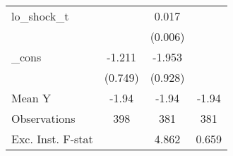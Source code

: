 {\begin{tabular}{l*{3}{c}}
\addlinespace
lo\_shock\_t  &                     &       0.017\sym{***}&                     \\
            &                     &     (0.006)         &                     \\
\addlinespace
\_cons      &      -1.211         &      -1.953\sym{**} &                     \\
            &     (0.749)         &     (0.928)         &                     \\
\midrule
Mean Y      &       -1.94         &       -1.94         &       -1.94         \\
Observations&         398         &         381         &         381         \\
Exc. Inst. F-stat&                     &       4.862         &       0.659         \\
\bottomrule
\end{tabular}
}
